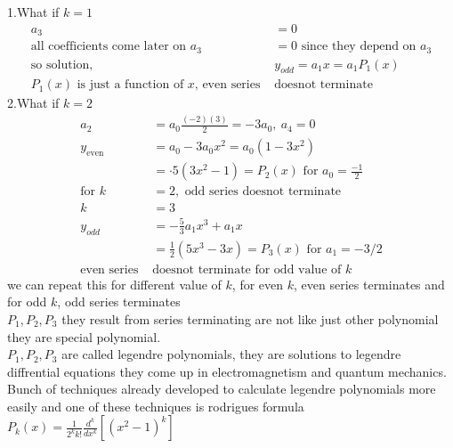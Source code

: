 1.\quad What if $k=1$ 
\begin{align*}
 a_3&=0\\
\text{all coefficients come later on }a_3&=0 
\text{ since they depend on }a_3\\
\text{so solution},\ 
&y_{odd}=a_1x=a_1P_1(x)\\
P_1(x)\text{ is just a function of $x$}
\text{, even series }&\text{doesnot terminate}\end{align*}
2.\quad What if $k=2$
\begin{align*}
a_2&=a_{0} \frac{(-2)(3)}{2}=-3 a_{0}, \ a_{4}=0\\
y_{\text {even }}&=a_{0}-3 a_{0} x^{2}=a_{0}\left(1-3 x^{2}\right)\\
&=\cdot 5\left(3 x^{2}-1\right)=P_{2}(x) \text{ for }a_0=\frac{-1}{2}\\
\text{for }k&=2,\text{ odd series doesnot terminate}\\
k&=3\\
y_ {odd} &=-\frac{5}{3} a_1 x^{3}+a_{1} x\\
&=\frac{1}{2}\left(5 x^{3}-3 x\right)=P_{3}(x)\text{ for }a_{1}=-3 / 2\\
\text{even series }&\text{doesnot terminate for odd value of $k$}
\end{align*}
we can repeat this for different value of $k$, for even $k$, even series terminates and 
for odd $k$, odd series terminates\\
$P_1, P_2, P_3$ they result from series terminating are not like just other polynomial they are special polynomial.\\
$P_1, P_2, P_3$ are called legendre polynomials, they are solutions to legendre diffrential equations they come up in electromagnetism and quantum mechanics. Bunch of techniques already developed to calculate legendre polynomials more easily and one of these techniques is rodrigues formula
$P_{k}(x)=\frac{1}{2^{k} k !} \frac{d^{k}}{d x^{k}}\left[\left(x^{2}-1\right)^{k}\right]$\\
